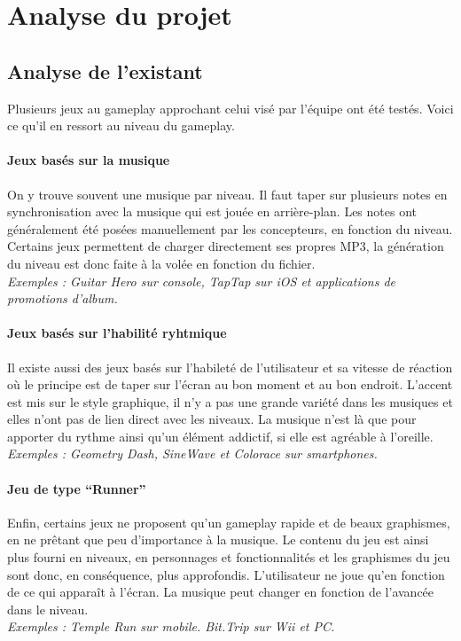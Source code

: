 \section{Analyse du projet} %

\subsection{Analyse de l'existant}

Plusieurs jeux au gameplay approchant celui visé par l’équipe ont été testés. Voici ce qu’il en ressort au niveau du gameplay.
\paragraph{Jeux basés sur la musique}
On y trouve souvent une musique par niveau. Il faut taper sur plusieurs notes en synchronisation avec la musique qui est jouée en arrière-plan. Les notes ont généralement été posées manuellement par les concepteurs, en fonction du niveau. Certains jeux permettent de charger directement ses propres MP3, la génération du niveau est donc faite à la volée en fonction du fichier.\\
\textit{Exemples : Guitar Hero sur console, TapTap sur iOS et applications de promotions d’album.}
\paragraph{Jeux basés sur l’habilité ryhtmique}
Il existe aussi des jeux basés sur l’habileté de l’utilisateur et sa vitesse de réaction où le principe est de taper sur l’écran au bon moment et au bon endroit. L'accent est mis sur le style graphique, il n'y a pas une grande variété dans les musiques et elles n'ont pas de lien direct avec les niveaux. La musique n'est là que pour apporter du rythme ainsi qu’un élément addictif, si elle est agréable à l’oreille.\\
\textit{Exemples : Geometry Dash, SineWave et Colorace sur smartphones.}
\paragraph{Jeu de type “Runner”}
Enfin, certains jeux ne proposent qu’un gameplay rapide et de beaux graphismes, en ne prêtant que peu d’importance à la musique. Le contenu du jeu est ainsi plus fourni en niveaux, en personnages et fonctionnalités et les graphismes du jeu sont donc, en conséquence, plus approfondis. L’utilisateur ne joue qu’en fonction de ce qui apparaît à l’écran. La musique peut changer en fonction de l’avancée dans le niveau.\\
\textit{Exemples : Temple Run sur mobile. Bit.Trip sur Wii et PC.}

